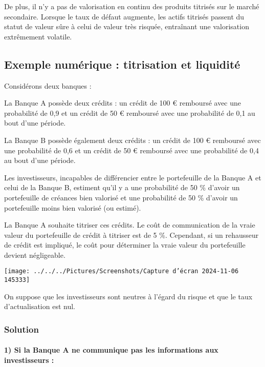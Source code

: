 \documentclass[a4paper, 12pt]{report}
\begin{document}
De plus, il n'y a pas de valorisation en continu des produits titrisés sur le marché secondaire. Lorsque le taux de défaut augmente, les actifs titrisés passent du statut de valeur sûre à celui de valeur très risquée, entraînant une valorisation extrêmement volatile.

\subsection{Exemple numérique : titrisation et liquidité}

Considérons deux banques :

La Banque A possède deux crédits : un crédit de 100 € remboursé avec une probabilité de 0,9 et un crédit de 50 € remboursé avec une probabilité de 0,1 au bout d'une période. 

La Banque B possède également deux crédits : un crédit de 100 € remboursé avec une probabilité de 0,6 et un crédit de 50 € remboursé avec une probabilité de 0,4 au bout d'une période. 

Les investisseurs, incapables de différencier entre le portefeuille de la Banque A et celui de la Banque B, estiment qu'il y a une probabilité de 50 \% d'avoir un portefeuille de créances bien valorisé et une probabilité de 50 \% d'avoir un portefeuille moins bien valorisé (ou estimé).

La Banque A souhaite titriser ces crédits. Le coût de communication de la vraie valeur du portefeuille de crédit à titriser est de 5 \%. Cependant, si un rehausseur de crédit est impliqué, le coût pour déterminer la vraie valeur du portefeuille devient négligeable.

\begin{center}
	\texttt{[image: ../../../Pictures/Screenshots/Capture d'écran 2024-11-06 145333]}
\end{center}

On suppose que les investisseurs sont neutres à l'égard du risque et que le taux d'actualisation est nul.

\subsubsection{Solution}

\paragraph{1) Si la Banque A ne communique pas les informations aux investisseurs :}
\end{document}
